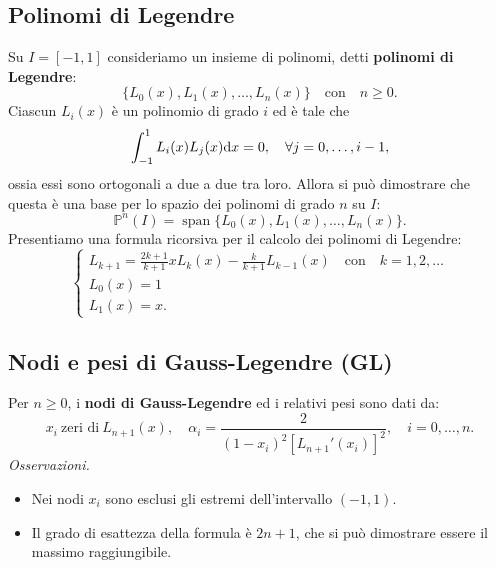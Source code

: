\subsection{Polinomi di Legendre}

Su $I=[ -1,1]$ consideriamo un insieme di polinomi, detti \textbf{polinomi di Legendre}:
\begin{equation*}
\{L_{0}(x) ,L_{1}(x) ,\dotsc ,L_{n}(x)\} \quad \text{con} \quad n\geqslant 0.
\end{equation*}
Ciascun $L_{i}(x)$ è un polinomio di grado $i$ ed è tale che
\begin{equation*}
\int\nolimits ^{1}_{-1} L_{i}(x) L_{j}(x) \mathrm d x=0,\quad \forall j=0,\dotsc ,i-1,
\end{equation*}
ossia essi sono ortogonali a due a due tra loro. Allora si può dimostrare che questa è una base per lo spazio dei polinomi di grado $n$ su $I$:
\begin{equation*}
\mathbb{P}^{n}(I) =\operatorname{span}\{L_{0}(x) ,L_{1}(x) ,\dotsc ,L_{n}(x)\} .
\end{equation*}
Presentiamo una formula ricorsiva per il calcolo dei polinomi di Legendre:
\begin{equation*}
\begin{cases}
L_{k+1} =\frac{2k+1}{k+1} xL_{k}(x) -\frac{k}{k+1} L_{k-1}(x) \quad \text{con} \quad k=1,2,\dotsc \\
L_{0}(x) =1\\
L_{1}(x) =x.
\end{cases}
\end{equation*}
\subsection{Nodi e pesi di Gauss-Legendre (GL)}

Per $n\geqslant 0$, i \textbf{nodi di Gauss-Legendre} ed i relativi pesi sono dati da:
\begin{equation*}
x_{i} \ \text{zeri di} \ L_{n+1}(x) ,\quad \alpha _{i} =\frac{2}{( 1-x_{i})^{2}[ L_{n+1} '( x_{i})]^{2}} ,\quad i=0,\dotsc ,n.
\end{equation*}
\textit{Osservazioni.}
\begin{itemize}
\item Nei nodi $x_{i}$ sono esclusi gli estremi dell'intervallo $( -1,1)$.
\item Il grado di esattezza della formula è $2n+1$, che si può dimostrare essere il massimo raggiungibile.
\end{itemize}

